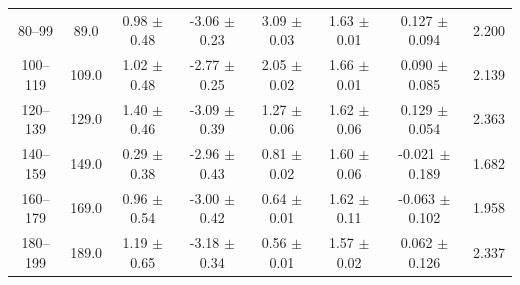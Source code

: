 \begin{table}[htbp]
\begin{tabular}{c c c c c c c c}
80--99 & 89.0 & 0.98 $\pm$ 0.48 & -3.06 $\pm$ 0.23 & 3.09 $\pm$ 0.03 & 1.63 $\pm$ 0.01 & 0.127 $\pm$ 0.094 & 2.200 \\
100--119 & 109.0 & 1.02 $\pm$ 0.48 & -2.77 $\pm$ 0.25 & 2.05 $\pm$ 0.02 & 1.66 $\pm$ 0.01 & 0.090 $\pm$ 0.085 & 2.139 \\
120--139 & 129.0 & 1.40 $\pm$ 0.46 & -3.09 $\pm$ 0.39 & 1.27 $\pm$ 0.06 & 1.62 $\pm$ 0.06 & 0.129 $\pm$ 0.054 & 2.363 \\
140--159 & 149.0 & 0.29 $\pm$ 0.38 & -2.96 $\pm$ 0.43 & 0.81 $\pm$ 0.02 & 1.60 $\pm$ 0.06 & -0.021 $\pm$ 0.189 & 1.682 \\
160--179 & 169.0 & 0.96 $\pm$ 0.54 & -3.00 $\pm$ 0.42 & 0.64 $\pm$ 0.01 & 1.62 $\pm$ 0.11 & -0.063 $\pm$ 0.102 & 1.958 \\
180--199 & 189.0 & 1.19 $\pm$ 0.65 & -3.18 $\pm$ 0.34 & 0.56 $\pm$ 0.01 & 1.57 $\pm$ 0.02 & 0.062 $\pm$ 0.126 & 2.337 \\
\hline\hline
\end{tabular}
\end{table}